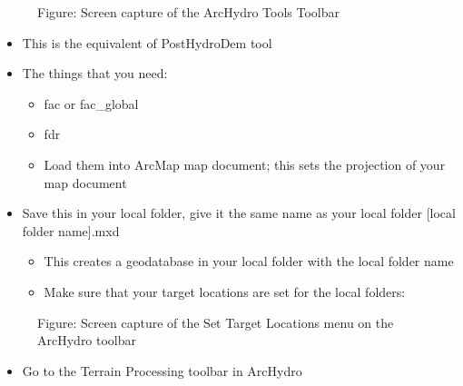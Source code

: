 \documentclass[letterpaper,10pt,english]{sphinxmanual}
\begin{document}
\begin{figure}[htbp]
\centering
\capstart

\noindent{}
\caption{Figure: Screen capture of the ArcHydro Tools Toolbar}\label{\detokenize{ex_2:id2}}\end{figure}
\begin{itemize}
\item {} 
This is the equivalent of PostHydroDem tool

\item {} 
The things that you need:
\begin{itemize}
\item {} 
fac or fac\_global

\item {} 
fdr

\item {} 
Load them into ArcMap map document; this sets the projection of your map document

\end{itemize}

\item {} 
Save this in your local folder, give it the same name as your local folder {[}local folder name{]}.mxd
\begin{itemize}
\item {} 
This creates a geodatabase in your local folder with the local folder name

\item {} 
Make sure that your target locations are set for the local folders:

\end{itemize}

\end{itemize}

\begin{figure}[htbp]
\centering
\capstart

\noindent{}
\caption{Figure: Screen capture of the Set Target Locations menu on the ArcHydro toolbar}\label{\detokenize{ex_2:id3}}\end{figure}
\begin{itemize}
\item {} 
Go to the Terrain Processing toolbar in ArcHydro

\end{itemize}
\end{document}
